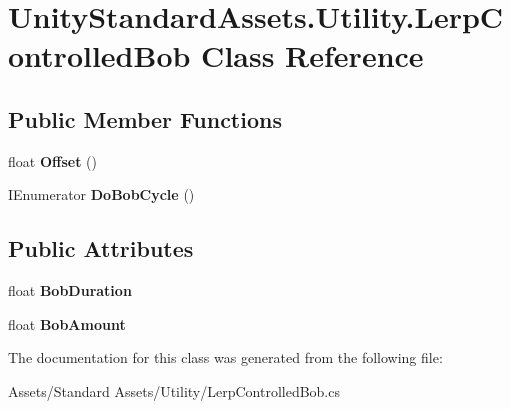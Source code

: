 \hypertarget{class_unity_standard_assets_1_1_utility_1_1_lerp_controlled_bob}{}\section{Unity\+Standard\+Assets.\+Utility.\+Lerp\+Controlled\+Bob Class Reference}
\label{class_unity_standard_assets_1_1_utility_1_1_lerp_controlled_bob}
\subsection*{Public Member Functions}
\begin{DoxyCompactItemize}
\item 
float {\bfseries Offset} ()\hypertarget{class_unity_standard_assets_1_1_utility_1_1_lerp_controlled_bob_a6260e516b19ee9440bb22c160d0cbed9}{}\label{class_unity_standard_assets_1_1_utility_1_1_lerp_controlled_bob_a6260e516b19ee9440bb22c160d0cbed9}

\item 
I\+Enumerator {\bfseries Do\+Bob\+Cycle} ()\hypertarget{class_unity_standard_assets_1_1_utility_1_1_lerp_controlled_bob_a22a2016a4d643696d81fc5e5d0809832}{}\label{class_unity_standard_assets_1_1_utility_1_1_lerp_controlled_bob_a22a2016a4d643696d81fc5e5d0809832}

\end{DoxyCompactItemize}
\subsection*{Public Attributes}
\begin{DoxyCompactItemize}
\item 
float {\bfseries Bob\+Duration}\hypertarget{class_unity_standard_assets_1_1_utility_1_1_lerp_controlled_bob_a7b2e1bb225e6350e7e95617457c2c0e9}{}\label{class_unity_standard_assets_1_1_utility_1_1_lerp_controlled_bob_a7b2e1bb225e6350e7e95617457c2c0e9}

\item 
float {\bfseries Bob\+Amount}\hypertarget{class_unity_standard_assets_1_1_utility_1_1_lerp_controlled_bob_a877cd224920e669aee363f5acc38c711}{}\label{class_unity_standard_assets_1_1_utility_1_1_lerp_controlled_bob_a877cd224920e669aee363f5acc38c711}

\end{DoxyCompactItemize}


The documentation for this class was generated from the following file\+:\begin{DoxyCompactItemize}
\item 
Assets/\+Standard Assets/\+Utility/Lerp\+Controlled\+Bob.\+cs\end{DoxyCompactItemize}
